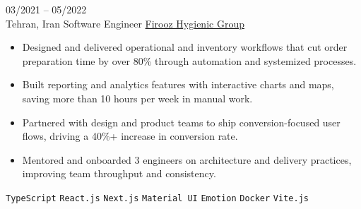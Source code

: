 \entry
{03/2021 -- 05/2022 \\ Tehran, Iran}
{Software Engineer}
{\href{https://firoozshop.com/}{Firooz Hygienic Group}}
{\vspace{-10pt}
    \begin{itemize}[noitemsep,topsep=0pt,parsep=0pt,partopsep=0pt, leftmargin=-1pt]
        \item Designed and delivered operational and inventory workflows that cut order preparation time by over 80\% through automation and systemized processes.
        \item Built reporting and analytics features with interactive charts and maps, saving more than 10 hours per week in manual work.
        \item Partnered with design and product teams to ship conversion-focused user flows, driving a 40\%+ increase in conversion rate.
        \item Mentored and onboarded 3 engineers on architecture and delivery practices, improving team throughput and consistency.
    \end{itemize}
    \texttt{TypeScript} \slashsep \texttt{React.js} \slashsep \texttt{Next.js} \slashsep \texttt{Material UI} \slashsep \texttt{Emotion} \slashsep \texttt{Docker} \slashsep \texttt{Vite.js}
}
